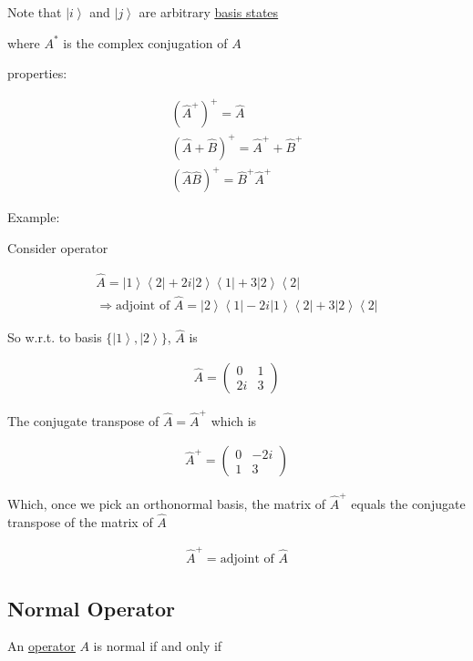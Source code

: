 \documentclass[
]{article}
\let\oldhyperref\hyperref
\renewcommand{\hyperref}[2][]{\oldhyperref[#1]{\underline{#2}}}
\providecommand{\ket}[1]{\left\lvert #1 \right\rangle}
\providecommand{\bra}[1]{\left\langle #1 \right\rvert}
\providecommand{\Rarr}{\Rightarrow}
\begin{document}
Note that \(\ket{i}\) and \(\ket{j}\) are arbitrary \hyperref[basis-states]{basis states}

where \(A^*\) is the complex conjugation of \(A\)

properties:

\begin{gather*}
	(\hat{A}^+)^+=\hat{A}\\
	(\hat{A}+\hat{B})^+=\hat{A}^++\hat{B}^+\\
	(\hat{A}\hat{B})^+=\hat{B}^+\hat{A}^+
\end{gather*}

Example:

Consider operator

\begin{gather*}
	\hat{A}=\ket{1}\bra{2}+2i\ket{2}\bra{1}+3\ket{2}\bra{2}\\
	\Rarr \text{adjoint of $\hat{A}$}=\ket{2}\bra{1}-2i\ket{1}\bra{2}+3\ket{2}\bra{2}
\end{gather*}

So w.r.t. to basis \(\{\ket{1},\ket{2}\}\), \(\hat{A}\) is

\begin{gather*}
	\hat{A}=\begin{pmatrix}
		0  & 1 \\
		2i & 3
	\end{pmatrix}
\end{gather*}

The conjugate transpose of \(\hat{A}=\hat{A}^+\) which is

\begin{gather*}
	\hat{A}^+=\begin{pmatrix}
		0 & -2i \\
		1 & 3
	\end{pmatrix}
\end{gather*}

Which, once we pick an orthonormal basis, the matrix of \(\hat{A}^+\)
equals the conjugate transpose of the matrix of \(\hat{A}\)

\begin{gather*}
	\hat{A}^+=\text{adjoint of $\hat{A}$}
\end{gather*}

\subsection{Normal Operator}\label{normal-operator}

An \hyperref[operators]{operator} $A$ is normal if and only if
\end{document}
